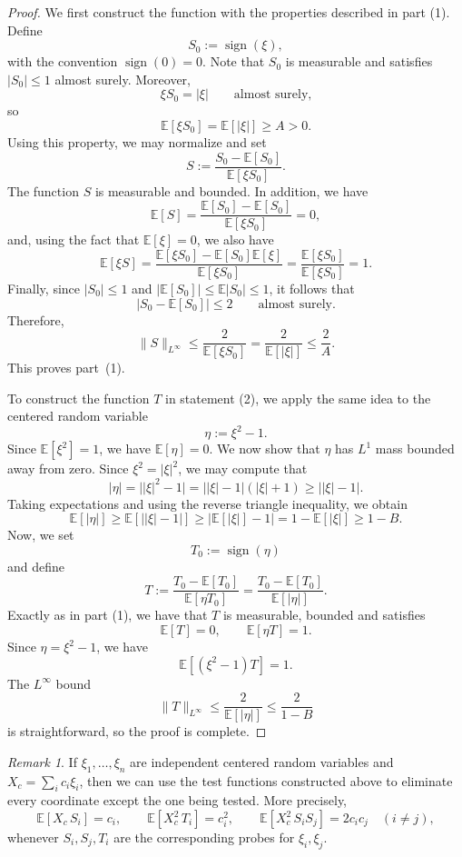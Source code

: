 \documentclass[11pt]{amsart}
\numberwithin{equation}{section}
\theoremstyle{definition}
\theoremstyle{remark}
\newtheorem{remark}[theorem]{Remark}
\newcommand{\E}{\mathbb E}
\newcommand{\sgn}{\operatorname{sign}}
\newcommand{\abs}[1]{\lvert #1 \rvert}
\newcommand{\norm}[1]{\lVert #1 \rVert}
\begin{document}
\begin{proof}
We first construct the function with the properties described in part (1).  Define
\[
S_0:=\sgn(\xi),
\]
with the convention $\sgn(0)=0$.  Note that $S_0$ is measurable and satisfies
$|S_0|\le 1$ almost surely.  Moreover,
\[
\xi S_0=\abs{\xi}
\qquad\text{almost surely,}
\]
so
\[
\E[\xi S_0]=\E[\abs{\xi}]\ge A>0.
\]
Using this property, we may normalize and set
\[
S:=\frac{S_0-\E[S_0]}{\E[\xi S_0]}.
\]
The function $S$ is measurable and bounded. In addition, we have
\[
\E[S]=\frac{\E[S_0]-\E[S_0]}{\E[\xi S_0]}=0,
\]
and, using the fact that $\E[\xi]=0$, we also have
\[
\E[\xi S]
=\frac{\E[\xi S_0]-\E[S_0]\E[\xi]}{\E[\xi S_0]}
=\frac{\E[\xi S_0]}{\E[\xi S_0]}
=1.
\]
Finally, since $|S_0|\le1$ and $|\E[S_0]|\le \E|S_0|\le1$, it follows that
\[
|S_0-\E[S_0]|\le 2
\qquad\text{almost surely.}
\]
Therefore,
\[
\norm{S}_{L^\infty}
\le \frac{2}{\E[\xi S_0]}
=\frac{2}{\E[\abs{\xi}]}
\le \frac{2}{A}.
\]
This proves part~\rm(1).

To construct the function $T$ in statement (2), we apply the same idea to the centered random variable
\[
\eta:=\xi^2-1.
\]
Since $\E[\xi^2]=1$, we have $\E[\eta]=0$.  We now show that $\eta$ has
 $L^1$ mass bounded away from zero.  Since $\xi^2=\abs{\xi}^2$, we may compute that
\[
\abs{\eta}
=\abs{\abs{\xi}^2-1}
=\abs{\abs{\xi}-1}(\abs{\xi}+1)
\ge \abs{\abs{\xi}-1}.
\]
Taking expectations and using the reverse triangle inequality, we obtain
\[
\E[\abs{\eta}]
\ge \E[\abs{\abs{\xi}-1}]
\ge \bigl|\E[\abs{\xi}]-1\bigr|
=1-\E[\abs{\xi}]
\ge 1-B.
\]
Now, we set
\[
T_0:=\sgn(\eta)
\]
and define
\[
T:=\frac{T_0-\E[T_0]}{\E[\eta T_0]}
=\frac{T_0-\E[T_0]}{\E[\abs{\eta}]}.
\]
Exactly as in part (1), we have that $T$ is measurable, bounded and satisfies
\[
\E[T]=0,
\qquad
\E[\eta T]=1.
\]
Since $\eta=\xi^2-1$, we have
\[
\E[(\xi^2-1)T]=1.
\]
The $L^\infty$ bound 
\[
\norm{T}_{L^\infty}
\le \frac{2}{\E[\abs{\eta}]}
\le \frac{2}{1-B}
\]
is straightforward, so the proof is complete.
\end{proof}

\begin{remark}\label{rem:probe-extraction}
If $\xi_1,\dots,\xi_n$ are independent centered random variables and
$X_c=\sum_i c_i\xi_i$, then we can use the test functions constructed above to eliminate every
coordinate except the one being tested.  More precisely,
\[
\E[X_c\,S_i]=c_i,
\qquad
\E[X_c^2\,T_i]=c_i^2,
\qquad
\E[X_c^2\,S_iS_j]=2c_ic_j
\quad(i\ne j),
\]
whenever $S_i,S_j,T_i$ are the corresponding probes for $\xi_i,\xi_j$.
\end{remark}
\end{document}
